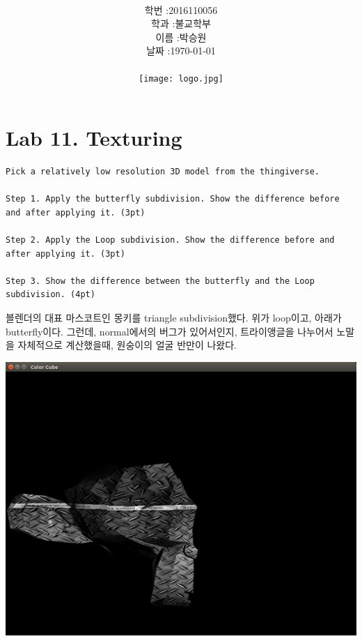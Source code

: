 \documentclass[12pt,a4paper]{article}
\title{
	\centering
	\pgfornament[width=12cm,color=teal]{84}\\
	\vspace{1cm}
	\fontsize{50}{50} \selectfont {컴퓨터 그래픽스 입문}\\
		\pgfornament[width=12cm,color=teal]{88}\\
	\vfill}
\author{
	\LARGE
	\begin{tabular}{rl}
		\hline
		학번 : & 2016110056\\ 
		학과 : & 불교학부 \\
		이름 : & 박승원\\
		날짜 : & \today\\
		\hline
	\end{tabular}\vspace{2cm}
	\\
\texttt{[image: logo.jpg]}
	}
\date{}
\begin{document}
\maketitle
{}
\noindent
\lstset{language=C++, columns=flexible, tabsize=4, frame=shadowbox, showstringspaces=false, breaklines=true, upquote=true, basicstyle=\normalsize}
\newpage
\section*{Lab 11. Texturing}
	
\begin{verbatim}
Pick a relatively low resolution 3D model from the thingiverse.

Step 1. Apply the butterfly subdivision. Show the difference before and after applying it. (3pt)

Step 2. Apply the Loop subdivision. Show the difference before and after applying it. (3pt)

Step 3. Show the difference between the butterfly and the Loop subdivision. (4pt)
\end{verbatim}

블렌더의 대표 마스코트인 몽키를 triangle subdivision했다.
위가 loop이고, 아래가 butterfly이다.
그런데, normal에서의 버그가 있어서인지, 트라이앵글을 나누어서 노말을 자체적으로 계산했을때,
원숭이의 얼굴 반만이 나왔다.

\includegraphics[width=\textwidth]{1.png}
\end{document}
